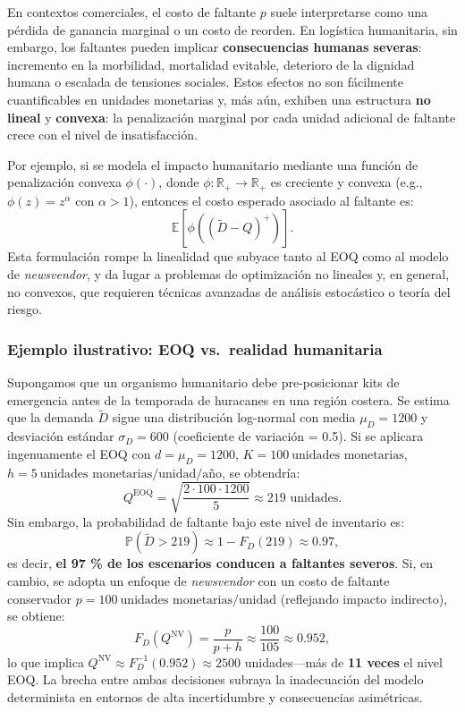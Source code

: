 \documentclass[
  spanish,
  us-letterpaper,
  DIV=11,
  numbers=noendperiod]{scrreprt}
\numberwithin{equation}{section}
\begin{document}
En contextos comerciales, el costo de faltante \(p\) suele interpretarse
como una pérdida de ganancia marginal o un costo de reorden. En
logística humanitaria, sin embargo, los faltantes pueden implicar
\textbf{consecuencias humanas severas}: incremento en la morbilidad,
mortalidad evitable, deterioro de la dignidad humana o escalada de
tensiones sociales. Estos efectos no son fácilmente cuantificables en
unidades monetarias y, más aún, exhiben una estructura \textbf{no
lineal} y \textbf{convexa}: la penalización marginal por cada unidad
adicional de faltante crece con el nivel de insatisfacción.

Por ejemplo, si se modela el impacto humanitario mediante una función de
penalización convexa \(\phi(\cdot)\), donde
\(\phi: \mathbb{R}_+ \to \mathbb{R}_+\) es creciente y convexa (e.g.,
\(\phi(z) = z^\alpha\) con \(\alpha > 1\)), entonces el costo esperado
asociado al faltante es: \[
\mathbb{E}[\phi((\tilde{D} - Q)^+)].
\] Esta formulación rompe la linealidad que subyace tanto al EOQ como al
modelo de \emph{newsvendor}, y da lugar a problemas de optimización no
lineales y, en general, no convexos, que requieren técnicas avanzadas de
análisis estocástico o teoría del riesgo.

\subsubsection{Ejemplo ilustrativo: EOQ vs.~realidad
humanitaria}\label{ejemplo-ilustrativo-eoq-vs.-realidad-humanitaria}

Supongamos que un organismo humanitario debe pre-posicionar kits de
emergencia antes de la temporada de huracanes en una región costera. Se
estima que la demanda \(\tilde{D}\) sigue una distribución log-normal
con media \(\mu_D = 1200\) y desviación estándar \(\sigma_D = 600\)
(coeficiente de variación = 0.5). Si se aplicara ingenuamente el EOQ con
\(d = \mu_D = 1200\), \(K = 100~\text{unidades monetarias}\),
\(h = 5~\text{unidades monetarias/unidad/año}\), se obtendría: \[
Q^{\text{EOQ}} = \sqrt{\frac{2 \cdot 100 \cdot 1200}{5}} \approx 219 \text{ unidades}.
\] Sin embargo, la probabilidad de faltante bajo este nivel de
inventario es: \[
\mathbb{P}(\tilde{D} > 219) \approx 1 - F_D(219) \approx 0.97,
\] es decir, \textbf{el 97 \% de los escenarios conducen a faltantes
severos}. Si, en cambio, se adopta un enfoque de \emph{newsvendor} con
un costo de faltante conservador
\(p = 100~\text{unidades monetarias/unidad}\) (reflejando impacto
indirecto), se obtiene: \[
F_D(Q^{\text{NV}}) = \frac{p}{p + h} \approx \frac{100}{105} \approx 0.952,
\] lo que implica \(Q^{\text{NV}} \approx F_D^{-1}(0.952) \approx 2500\)
unidades---más de \textbf{11 veces} el nivel EOQ. La brecha entre ambas
decisiones subraya la inadecuación del modelo determinista en entornos
de alta incertidumbre y consecuencias asimétricas.
\end{document}
